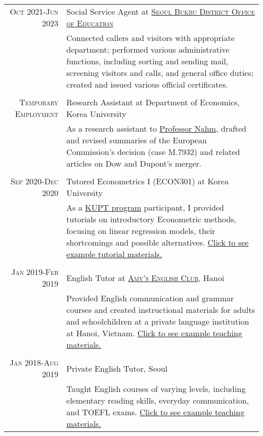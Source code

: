 \documentclass[a4paper,10pt]{article} %
\begin{document}
\begin{tabular}{r|p{11cm}}
\textsc{Oct 2021-Jun 2023} & Social Service Agent at \href{http://bbedu.sen.go.kr}{\textsc{Seoul Bukbu
District Office of Education}} \emph{}\\
& \footnotesize{Connected callers and visitors with appropriate department;
performed various administrative functions, including sorting and sending
mail, screening visitors and calls, and general office duties; created and
issued various official certificates.}\\
\multicolumn{2}{c}{} \\

\textsc{Temporary Employment} & Research Assistant at Department of Economics, Korea University\\ 
& \footnotesize{As a research assistant to
    \href{http://econ.korea.ac.kr/econ/?dt_team=%EB%82%A8%EC%9E%AC%ED%98%84-jae-nahm}{Professor
    Nahm}, drafted and revised summaries of the European Commission's decision (case M.7932) and related
articles on Dow and Dupont's merger.}\\
\multicolumn{2}{c}{} \\

\textsc{Sep 2020-Dec 2020} & Tutored Econometrics I (ECON301) at Korea
University \\
& \footnotesize{As a
\href{https://ctl.korea.ac.kr/front/content/view.do?content_seq=14}{KUPT
program} participant,
I provided tutorials on introductory Econometric methods, focusing on linear
regression models, their shortcomings and possible alternatives.
\href{https://drive.google.com/file/d/1CJsRSpE2bg21PmoyaiDFtcpwFTPXwAAa/view?usp=sharing}{Click
to see example tutorial materials.}} \\
\multicolumn{2}{c}{} \\

\textsc{Jan 2019-Feb 2019} & English Tutor at
\href{https://www.facebook.com/amy.englishclub}{\textsc{Amy's English Club}}, Hanoi \emph{}\\
& \footnotesize{Provided English communication
and grammar courses and created instructional materials for adults and schoolchildren at a private language
institution at Hanoi, Vietnam.
\href{https://drive.google.com/file/d/1Wb8tWkcThmKiy-Rv2OMMWRkrg-6ddooL/view?usp=sharing}{Click
to see example teaching materials.}}\\
\multicolumn{2}{c}{} \\


\textsc{Jan 2018-Aug 2019} & Private English Tutor, Seoul \emph{}\\
& \footnotesize{Taught English courses of varying
levels, including elementary reading skills,
everyday communication, and TOEFL exams. \href{https://drive.google.com/file/d/1uuF_h_x29hSJ3l61F7Kzxi_kKohBBTpJ/view?usp=sharing}{Click
to see example teaching materials.}}\\

\end{tabular}
\end{document}
